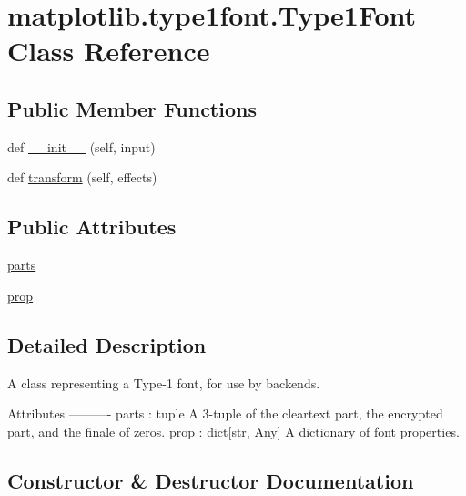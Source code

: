 \hypertarget{classmatplotlib_1_1type1font_1_1Type1Font}{}\section{matplotlib.\+type1font.\+Type1\+Font Class Reference}
\label{classmatplotlib_1_1type1font_1_1Type1Font}
\subsection*{Public Member Functions}
\begin{DoxyCompactItemize}
\item 
def \hyperlink{classmatplotlib_1_1type1font_1_1Type1Font_a45c9e50186618df4d0399cc527b2ad13}{\+\_\+\+\_\+init\+\_\+\+\_\+} (self, input)
\item 
def \hyperlink{classmatplotlib_1_1type1font_1_1Type1Font_a1249e50d6995b114aeae9cdd4015457d}{transform} (self, effects)
\end{DoxyCompactItemize}
\subsection*{Public Attributes}
\begin{DoxyCompactItemize}
\item 
\hyperlink{classmatplotlib_1_1type1font_1_1Type1Font_af0d7a248e0c4de889137018ad6c5368c}{parts}
\item 
\hyperlink{classmatplotlib_1_1type1font_1_1Type1Font_af98fdf9efaffcf7cd411bce061edb183}{prop}
\end{DoxyCompactItemize}


\subsection{Detailed Description}
\begin{DoxyVerb}A class representing a Type-1 font, for use by backends.

Attributes
----------
parts : tuple
    A 3-tuple of the cleartext part, the encrypted part, and the finale of
    zeros.
prop : dict[str, Any]
    A dictionary of font properties.
\end{DoxyVerb}
 

\subsection{Constructor \& Destructor Documentation}
\mbox{\label{classmatplotlib_1_1type1font_1_1Type1Font_a45c9e50186618df4d0399cc527b2ad13}} 
